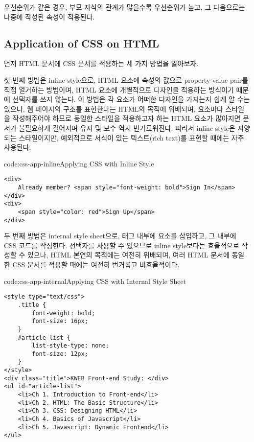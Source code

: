 우선순위가 같은 경우, 부모-자식의 관계가 많을수록 우선순위가 높고, 그 다음으로는 나중에 작성된 속성이 적용된다.

\subsection*{Application of CSS on HTML}
먼저 HTML 문서에 CSS 문서를 적용하는 세 가지 방법을 알아보자.

첫 번째 방법은 inline style으로, HTML 요소에  속성의 값으로 property-value pair를 직접 열거하는 방법이며, HTML 요소에 개별적으로 디자인을 적용하는 방식이기 때문에 선택자를 쓰지 않는다. 이 방법은 각 요소가 어떠한 디자인을 가지는지 쉽게 알 수는 있으나, 웹 페이지의 구조를 표현한다는 HTML의 목적에 위배되며, 요소마다 스타일을 작성해주어야 하므로 동일한 스타일을 적용하고자 하는 HTML 요소가 많아지면 문서가 불필요하게 길어지며 유지 및 보수 역시 번거로워진다. 따라서 inline style은 지양되는 스타일이지만, 예외적으로 서식이 있는 텍스트(rich text)를 표현할 때에는 자주 사용된다.

\begin{codeenv}{code:css-app-inline}{Applying CSS with Inline Style}\begin{verbatim}
<div>
    Already member? <span style="font-weight: bold">Sign In</span>
</div>
<div>
    <span style="color: red">Sign Up</span>
</div>
\end{verbatim}
\end{codeenv}

두 번째 방법은 internal style sheet으로,  태그 내부에  요소를 삽입하고, 그 내부에 CSS 코드를 작성한다. 선택자를 사용할 수 있으므로 inline style보다는 효율적으로 작성할 수 있으나, HTML 본연의 목적에는 여전히 위배되며, 여러 HTML 문서에 동일한 CSS 문서를 적용할 때에는 여전히 번거롭고 비효율적이다.

\begin{codeenv}{code:css-app-internal}{Applying CSS with Internal Style Sheet}\begin{verbatim}
<style type="text/css">
    .title {
        font-weight: bold;
        font-size: 16px;
    }
    #article-list {
        list-style-type: none;
        font-size: 12px;
    }
</style>
<div class="title">KWEB Front-end Study: </div>
<ul id="article-list">
    <li>Ch 1. Introduction to Front-end</li>
    <li>Ch 2. HTML: The Basic Structure</li>
    <li>Ch 3. CSS: Designing HTML</li>
    <li>Ch 4. Basics of Javascript</li>
    <li>Ch 5. Javascript: Dynamic Frontend</li>
</ul>
\end{verbatim}
\end{codeenv}


